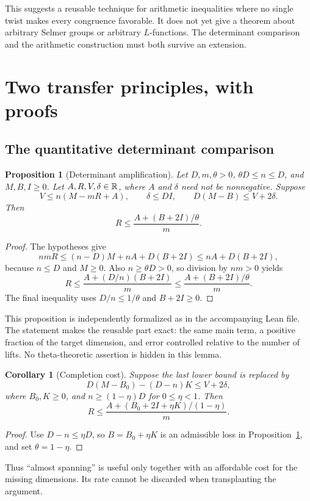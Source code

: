 \documentclass[11pt,letterpaper]{article}
\newtheorem{proposition}[theorem]{Proposition}
\newtheorem{corollary}[theorem]{Corollary}
\theoremstyle{definition}\newtheorem{definition}[theorem]{Definition}
\theoremstyle{remark}\newtheorem{remark}[theorem]{Remark}
\begin{document}
This suggests a reusable technique for arithmetic inequalities where no single twist makes
every congruence favorable. It does not yet give a theorem about arbitrary Selmer groups or
arbitrary $L$-functions. The determinant comparison and the arithmetic construction must
both survive an extension.

\section{Two transfer principles, with proofs}\label{sec:abstract}
\subsection{The quantitative determinant comparison}
\begin{proposition}[Determinant amplification]\label{prop:comparison}
Let $D,m,\theta>0$, $\theta D\le n\le D$, and $M,B,I\ge0$.
Let $A,R,V,\delta\in\mathbb R$, where $A$ and $\delta$ need not be nonnegative.
Suppose
\[
 V\le n(M-mR+A),\qquad \delta\le DI,\qquad
 D(M-B)\le V+2\delta.
\]
Then
\begin{equation}\label{eq:sharp}
 R\le\frac{A+(B+2I)/\theta}{m}.
\end{equation}
\end{proposition}
\begin{proof}
The hypotheses give
\[
 nmR\le(n-D)M+nA+D(B+2I)\le nA+D(B+2I),
\]
because $n\le D$ and $M\ge0$. Also $n\ge\theta D>0$, so division by $nm>0$ yields
\[
 R\le\frac{A+(D/n)(B+2I)}m
 \le\frac{A+(B+2I)/\theta}m.
\]
The final inequality uses $D/n\le1/\theta$ and $B+2I\ge0$.
\end{proof}
This proposition is independently formalized as
 in the accompanying Lean file.
The statement makes the reusable part exact: the same main term, a positive fraction of
the target dimension, and error controlled relative to the number of lifts.
No theta-theoretic assertion is hidden in this lemma.

\begin{corollary}[Completion cost]
Suppose the last lower bound is replaced by
\[
 D(M-B_0)-(D-n)K\le V+2\delta,
\]
where $B_0,K\ge0$, and $n\ge(1-\eta)D$ for $0\le\eta<1$. Then
\[
 R\le\frac{A+(B_0+2I+\eta K)/(1-\eta)}m.
\]
\end{corollary}
\begin{proof}
Use $D-n\le\eta D$, so $B=B_0+\eta K$ is an admissible loss in
Proposition~\ref{prop:comparison}, and set $\theta=1-\eta$.
\end{proof}
Thus ``almost spanning'' is useful only together with an affordable cost for the missing
dimensions. Its rate cannot be discarded when transplanting the argument.
\end{document}
